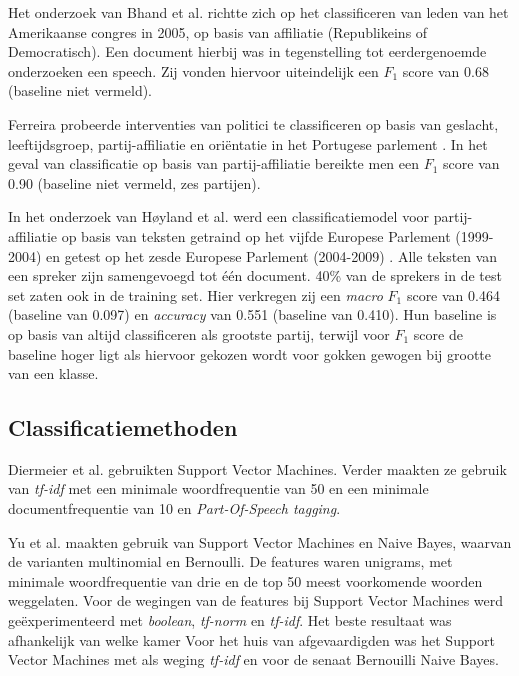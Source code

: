 Het onderzoek van Bhand et al. richtte zich op het classificeren van leden van het Amerikaanse congres in 2005, op basis van affiliatie (Republikeins of Democratisch)\cite{bhand}. Een document hierbij was in tegenstelling tot eerdergenoemde onderzoeken een speech. Zij vonden hiervoor uiteindelijk een $F_1$ score van 0.68 (baseline niet vermeld).\par

Ferreira probeerde interventies van politici te classificeren op basis van geslacht, leeftijdsgroep, partij-affiliatie en oriëntatie in het Portugese parlement \cite{Ferreira2016UsingTT}. In het geval van classificatie op basis van partij-affiliatie bereikte men een $F_1$ score van 0.90 (baseline niet vermeld, zes partijen).\par

In het onderzoek van Høyland et al. werd een classificatiemodel voor partij-affiliatie op basis van teksten getraind op het vijfde Europese Parlement (1999-2004) en getest op het zesde Europese Parlement (2004-2009) \cite{W14-2516}. Alle teksten van een spreker zijn samengevoegd tot één document. 40\% van de sprekers in de test set zaten ook in de training set. Hier verkregen zij een \textit{macro} $F_1$ score van 0.464 (baseline van 0.097) en \textit{accuracy} van 0.551 (baseline van 0.410). Hun baseline is op basis van altijd classificeren als grootste partij, terwijl voor $F_1$ score de baseline hoger ligt als hiervoor gekozen wordt voor gokken gewogen bij grootte van een klasse. \par

\subsection{Classificatiemethoden}
\label{sec:Deelvraag1}
Diermeier et al. \cite{diermeier_godbout_yu_kaufmann_2012} gebruikten Support Vector Machines. Verder maakten ze gebruik van \textit{tf-idf} met een minimale woordfrequentie van 50 en een minimale documentfrequentie van 10 en \textit{Part-Of-Speech tagging}.\par
Yu et al. \cite{doi:10.1080/19331680802149608} maakten gebruik van Support Vector Machines en Naive Bayes, waarvan de varianten multinomial en Bernoulli. De features waren unigrams, met minimale woordfrequentie van drie en de top 50 meest voorkomende woorden weggelaten. Voor de wegingen van de features bij Support Vector Machines werd geëxperimenteerd met \textit{boolean}, \textit{tf-norm} en \textit{tf-idf}. Het beste resultaat was afhankelijk van welke kamer Voor het huis van afgevaardigden was het Support Vector Machines met als weging \textit{tf-idf} en voor de senaat Bernouilli Naive Bayes.

